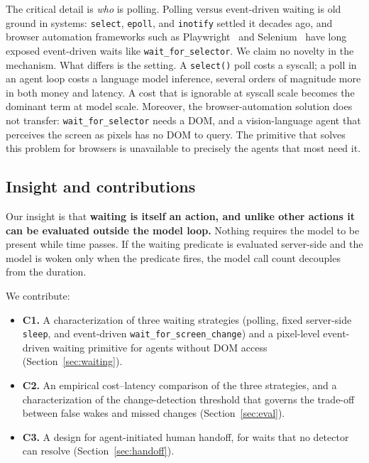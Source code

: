 \documentclass[conference]{IEEEtran}
\begin{document}
The critical detail is \emph{who} is polling. Polling versus event-driven waiting
is old ground in systems: \texttt{select}, \texttt{epoll}, and \texttt{inotify}
settled it decades ago, and browser automation frameworks such as
Playwright~\cite{playwright} and Selenium~\cite{selenium} have long exposed
event-driven waits like \texttt{wait\_for\_selector}. We claim no novelty in the
mechanism. What differs is the setting. A \texttt{select()} poll costs a syscall;
a poll in an agent loop costs a language model inference, several orders of
magnitude more in both money and latency. A cost that is ignorable at syscall
scale becomes the dominant term at model scale. Moreover, the browser-automation
solution does not transfer: \texttt{wait\_for\_selector} needs a DOM, and a
vision-language agent that perceives the screen as pixels has no DOM to query.
The primitive that solves this problem for browsers is unavailable to precisely
the agents that most need it.

\subsection{Insight and contributions}
Our insight is that \textbf{waiting is itself an action, and unlike other actions
it can be evaluated outside the model loop.} Nothing requires the model to be
present while time passes. If the waiting predicate is evaluated server-side and
the model is woken only when the predicate fires, the model call count decouples
from the duration.

We contribute:
\begin{itemize}
  \item \textbf{C1.} A characterization of three waiting strategies (polling,
  fixed server-side \texttt{sleep}, and event-driven
  \texttt{wait\_for\_screen\_change}) and a pixel-level event-driven waiting
  primitive for agents without DOM access (Section~\ref{sec:waiting}).
  \item \textbf{C2.} An empirical cost--latency comparison of the three
  strategies, and a characterization of the change-detection threshold that
  governs the trade-off between false wakes and missed changes
  (Section~\ref{sec:eval}).
  \item \textbf{C3.} A design for agent-initiated human handoff, for waits that
  no detector can resolve (Section~\ref{sec:handoff}).
\end{itemize}

\end{document}
